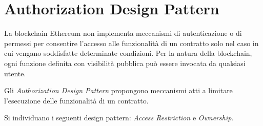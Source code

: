{\section{Authorization Design Pattern}
La blockchain Ethereum non implementa meccanismi di autenticazione o di permessi per consentire l'accesso alle funzionalità di un contratto solo nel caso in cui vengano soddisfatte determinate condizioni. Per la natura della blockchain, ogni funzione definita con visibilità pubblica può essere invocata da qualsiasi utente.\par
Gli \textit{Authorization Design Pattern} propongono meccanismi atti a limitare l'esecuzione delle funzionalità di un contratto.\par
Si individuano i seguenti design pattern: \textit{Access Restriction} e \textit{Ownership}.

}
